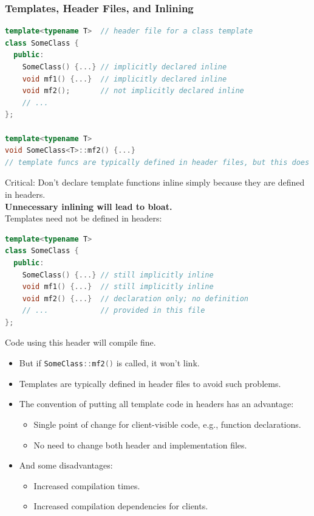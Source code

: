 \subsubsection{Templates, Header Files, and Inlining}
\begin{lstlisting}[language=C++]
template<typename T>  // header file for a class template
class SomeClass {
  public:
    SomeClass() {...} // implicitly declared inline
    void mf1() {...}  // implicitly declared inline
    void mf2();       // not implicitly declared inline
    // ...
};

template<typename T>
void SomeClass<T>::mf2() {...}
// template funcs are typically defined in header files, but this does not automatically declare them inline
\end{lstlisting}
Critical: Don't declare template functions inline simply because they are defined in headers.\\
\textbf{Unnecessary inlining will lead to bloat.}\\

Templates need not be defined in headers:
\begin{lstlisting}[language=C++]
template<typename T>
class SomeClass {
  public:
    SomeClass() {...} // still implicitly inline
    void mf1() {...}  // still implicitly inline
    void mf2() {...}  // declaration only; no definition
    // ...            // provided in this file
};
\end{lstlisting}
Code using this header will compile fine.
\begin{itemize}
  \item But if \lstinline[language=C++]{SomeClass::mf2()} is called, it won't link.
  \item Templates are typically defined in header files to avoid such problems.
\end{itemize}

\begin{itemize}
  \item The convention of putting all template code in headers has an advantage:
  \begin{itemize}
    \item Single point of change for client-visible code, e.g., function declarations.
    \item No need to change both header and implementation files.
  \end{itemize}
  \item And some disadvantages:
  \begin{itemize}
    \item Increased compilation times.
    \item Increased compilation dependencies for clients.
  \end{itemize}
\end{itemize}

